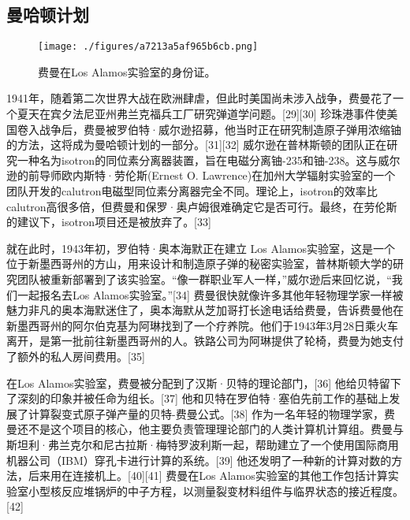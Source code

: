 \subsection{曼哈顿计划}
\begin{figure}[ht]
\centering
\texttt{[image: ./figures/a7213a5af965b6cb.png]}
\caption{费曼在Los Alamos实验室的身份证。} \label{fig_Feynma_1}
\end{figure}
1941年，随着第二次世界大战在欧洲肆虐，但此时美国尚未涉入战争，费曼花了一个夏天在宾夕法尼亚州弗兰克福兵工厂研究弹道学问题。[29][30] 珍珠港事件使美国卷入战争后，费曼被罗伯特·威尔逊招募，他当时正在研究制造原子弹用浓缩铀的方法，这将成为曼哈顿计划的一部分。[31][32] 威尔逊在普林斯顿的团队正在研究一种名为isotron的同位素分离器装置，旨在电磁分离铀-235和铀-238。这与威尔逊的前导师欧内斯特·劳伦斯(Ernest O. Lawrence)在加州大学辐射实验室的一个团队开发的calutron电磁型同位素分离器完全不同。理论上，isotron的效率比calutron高很多倍，但费曼和保罗·奥卢姆很难确定它是否可行。最终，在劳伦斯的建议下，isotron项目还是被放弃了。[33]

就在此时，1943年初，罗伯特·奥本海默正在建立 Los Alamos实验室，这是一个位于新墨西哥州的方山，用来设计和制造原子弹的秘密实验室，普林斯顿大学的研究团队被重新部署到了该实验室。“像一群职业军人一样，”威尔逊后来回忆说，“我们一起报名去Los Alamos实验室。”[34] 费曼很快就像许多其他年轻物理学家一样被魅力非凡的奥本海默迷住了，奥本海默从芝加哥打长途电话给费曼，告诉费曼他在新墨西哥州的阿尔伯克基为阿琳找到了一个疗养院。他们于1943年3月28日乘火车离开，是第一批前往新墨西哥州的人。铁路公司为阿琳提供了轮椅，费曼为她支付了额外的私人房间费用。[35]

在Los Alamos实验室，费曼被分配到了汉斯·贝特的理论部门，[36] 他给贝特留下了深刻的印象并被任命为组长。[37] 他和贝特在罗伯特·塞伯先前工作的基础上发展了计算裂变式原子弹产量的贝特-费曼公式。[38] 作为一名年轻的物理学家，费曼还不是这个项目的核心，他主要负责管理理论部门的人类计算机计算组。费曼与斯坦利·弗兰克尔和尼古拉斯·梅特罗波利斯一起，帮助建立了一个使用国际商用机器公司（IBM）穿孔卡进行计算的系统。[39] 他还发明了一种新的计算对数的方法，后来用在连接机上。[40][41] 费曼在Los Alamos实验室的其他工作包括计算实验室小型核反应堆锅炉的中子方程，以测量裂变材料组件与临界状态的接近程度。[42]

